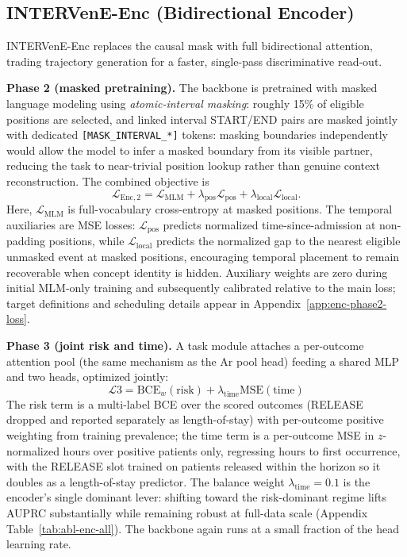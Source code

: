 \documentclass[letterpaper]{article} %
\begin{document}
\subsection{INTERVenE-Enc (Bidirectional Encoder)}

INTERVenE-Enc replaces the causal mask with full bidirectional attention, trading trajectory generation for a faster, single-pass discriminative read-out.

\textbf{Phase 2 (masked pretraining).} The backbone is pretrained with masked language modeling using \emph{atomic-interval masking}: roughly 15\% of eligible positions are selected, and linked interval START/END pairs are masked jointly with dedicated \texttt{[MASK\_INTERVAL\_*]} tokens: masking boundaries independently would allow the model to infer a masked boundary from its visible partner, reducing the task to near-trivial position lookup rather than genuine context reconstruction. The combined objective is
\begin{equation}
\mathcal{L}_{\mathrm{Enc},2}
= \mathcal{L}_{\mathrm{MLM}}
+ \lambda_{\mathrm{pos}}\mathcal{L}_{\mathrm{pos}}
+ \lambda_{\mathrm{local}}\mathcal{L}_{\mathrm{local}}.
\end{equation}
Here, $\mathcal{L}_{\mathrm{MLM}}$ is full-vocabulary cross-entropy at masked positions. The temporal auxiliaries are MSE losses: $\mathcal{L}_{\mathrm{pos}}$ predicts normalized time-since-admission at non-padding positions, while $\mathcal{L}_{\mathrm{local}}$ predicts the normalized gap to the nearest eligible unmasked event at masked positions, encouraging temporal placement to remain recoverable when concept identity is hidden. Auxiliary weights are zero during initial MLM-only training and subsequently calibrated relative to the main loss; target definitions and scheduling details appear in Appendix~\ref{app:enc-phase2-loss}.

\textbf{Phase 3 (joint risk and time).} A task module attaches a per-outcome attention pool (the same mechanism as the Ar pool head) feeding a shared MLP and two heads, optimized jointly:
\begin{equation}
\mathcal{L}3 = \mathrm{BCE}_{w}(\text{risk}) + \lambda_{\text{time}}\mathrm{MSE}(\text{time})
\end{equation}
The risk term is a multi-label BCE over the scored outcomes (RELEASE dropped and reported separately as length-of-stay) with per-outcome positive weighting from training prevalence; the time term is a per-outcome MSE in $z$-normalized hours over positive patients only, regressing hours to first occurrence, with the RELEASE slot trained on patients released within the horizon so it doubles as a length-of-stay predictor. The balance weight $\lambda_{\text{time}}{=}0.1$ is the encoder's single dominant lever: shifting toward the risk-dominant regime lifts AUPRC substantially while remaining robust at full-data scale (Appendix Table~\ref{tab:abl-enc-all}). The backbone again runs at a small fraction of the head learning rate.
\end{document}
